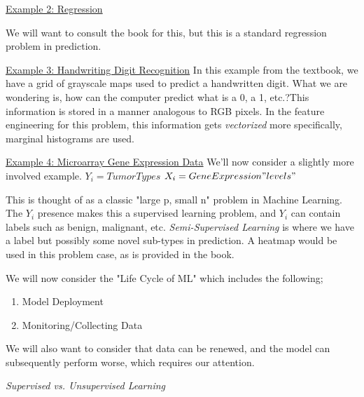 \documentclass[12pt, letterpaper]{article}
\begin{document}
\underline{Example 2: Regression}

We will want to consult the book for this, but this is a standard regression problem in prediction. 

\underline{Example 3: Handwriting Digit Recognition}
In this example from the textbook, we have a grid of grayscale maps used to predict a handwritten digit. What we are wondering is, how can the computer predict what is a 0, a 1, etc.?This information is stored in a manner analogous to RGB pixels.
In the feature engineering for this problem, this information gets \textit{vectorized} more specifically, marginal histograms are used. 

\underline{Example 4: Microarray Gene Expression Data}
We'll now consider a slightly more involved example. 
$Y_i = Tumor Types$
$X_i = Gene Expression "levels"$

This is thought of as a classic "large p, small n" problem in Machine Learning. 
The $Y_i$ presence makes this a supervised learning problem, and $Y_i$ can contain labels such as benign, malignant, etc. 
\textit{Semi-Supervised Learning} is where we have a label but possibly some novel sub-types in prediction. 
A heatmap would be used in this problem case, as is provided in the book. 

We will now consider the "Life Cycle of ML" which includes the following; 
\begin{enumerate}
		\item Model Deployment
		\item Monitoring/Collecting Data 
\end{enumerate}

We will also want to consider that data can be renewed, and the model can subsequently perform worse, which requires our attention. 

\textit{Supervised vs. Unsupervised Learning}
\end{document}
